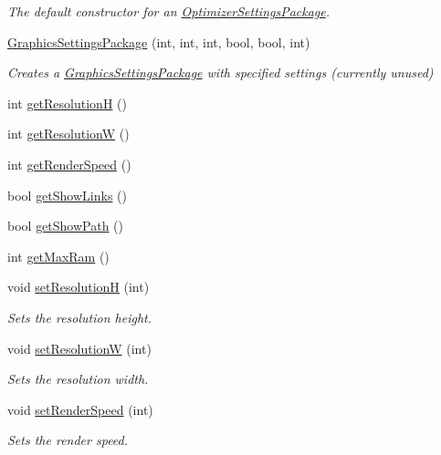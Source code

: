 \begin{DoxyCompactItemize}
\begin{DoxyCompactList}\small\item\em The default constructor for an \hyperlink{class_optimizer_settings_package}{Optimizer\+Settings\+Package}. \end{DoxyCompactList}\item 
\hyperlink{class_graphics_settings_package_a09daf855313f3986824a336ee8be7144}{Graphics\+Settings\+Package} (int, int, int, bool, bool, int)
\begin{DoxyCompactList}\small\item\em Creates a \hyperlink{class_graphics_settings_package}{Graphics\+Settings\+Package} with specified settings (currently unused) \end{DoxyCompactList}\item 
int \hyperlink{class_graphics_settings_package_a878709b5b337eeb1ecd41ff36bc3774c}{get\+ResolutionH} ()
\item 
int \hyperlink{class_graphics_settings_package_ae2fbf744672662adde93eaf74c0f3dcf}{get\+ResolutionW} ()
\item 
int \hyperlink{class_graphics_settings_package_ae156dc777c17b698950fb873c427ffeb}{get\+Render\+Speed} ()
\item 
bool \hyperlink{class_graphics_settings_package_a633283a363dcf21db5e4c04d9b79fa2d}{get\+Show\+Links} ()
\item 
bool \hyperlink{class_graphics_settings_package_a4045a81b41cacf97a38212c5a4c65418}{get\+Show\+Path} ()
\item 
int \hyperlink{class_graphics_settings_package_aa6cc824f2ba164264dd79d766f6ed0da}{get\+Max\+Ram} ()
\item 
void \hyperlink{class_graphics_settings_package_a0d9283ca3ba96e9bafeb92f250a71411}{set\+ResolutionH} (int)
\begin{DoxyCompactList}\small\item\em Sets the resolution height. \end{DoxyCompactList}\item 
void \hyperlink{class_graphics_settings_package_a83cc77d7339a3a68dac112c226308a0f}{set\+ResolutionW} (int)
\begin{DoxyCompactList}\small\item\em Sets the resolution width. \end{DoxyCompactList}\item 
void \hyperlink{class_graphics_settings_package_af0e969ea73e1236bcf23cf6ea15e8fa5}{set\+Render\+Speed} (int)
\begin{DoxyCompactList}\small\item\em Sets the render speed. \end{DoxyCompactList}\item 

\end{DoxyCompactItemize}
